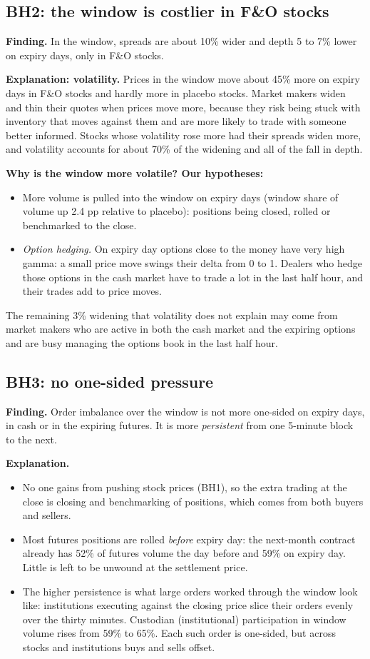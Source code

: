 \documentclass[11pt]{article}
\begin{document}
\subsection*{BH2: the window is costlier in F\&O stocks}
\textbf{Finding.} In the window, spreads are about 10\% wider and depth 5 to 7\% lower on
expiry days, only in F\&O stocks.

\textbf{Explanation: volatility.} Prices in the window move about 45\% more on expiry days in F\&O
stocks and hardly more in placebo stocks. Market makers widen and thin their quotes when prices
move more, because they risk being stuck with inventory that moves against them and are more
likely to trade with someone better informed. Stocks whose volatility rose more had their spreads
widen more, and volatility accounts for about 70\% of the widening and all of the fall in depth.

\textbf{Why is the window more volatile? Our hypotheses:}
\begin{itemize}
  \item More volume is pulled into the window on expiry days (window share of volume up 2.4 pp
  relative to placebo): positions being closed, rolled or benchmarked to the close.
  \item \emph{Option hedging.} On expiry day options close to the money have very high gamma: a
  small price move swings their delta from 0 to 1. Dealers who hedge those options in the cash
  market have to trade a lot in the last half hour, and their trades add to price moves.
\end{itemize}
The remaining 3\% widening that volatility does not explain may come from market makers who are
active in both the cash market and the expiring options and are busy managing the options book
in the last half hour.

\subsection*{BH3: no one-sided pressure}
\textbf{Finding.} Order imbalance over the window is not more one-sided on expiry days, in cash or
in the expiring futures. It is more \emph{persistent} from one 5-minute block to the next.

\textbf{Explanation.}
\begin{itemize}
  \item No one gains from pushing stock prices (BH1), so the extra trading at the close is
  closing and benchmarking of positions, which comes from both buyers and sellers.
  \item Most futures positions are rolled \emph{before} expiry day: the next-month contract
  already has 52\% of futures volume the day before and 59\% on expiry day. Little is left to be
  unwound at the settlement price.
  \item The higher persistence is what large orders worked through the window look like:
  institutions executing against the closing price slice their orders evenly over the thirty
  minutes. Custodian (institutional) participation in window volume rises from 59\% to 65\%.
  Each such order is one-sided, but across stocks and institutions buys and sells offset.
\end{itemize}
\end{document}
